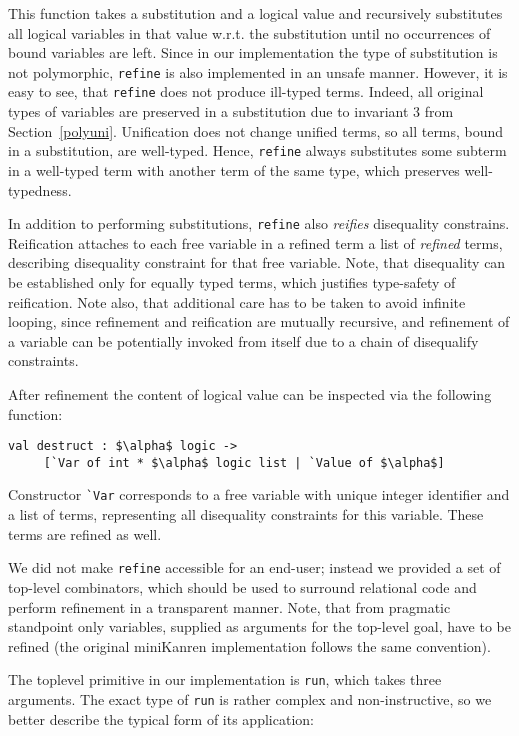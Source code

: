 \documentclass[10pt, oneside, nocopyrightspace]{sigplanconf}
\begin{document}
This function takes a substitution and a logical value and recursively substitutes
all logical variables in that value w.r.t. the substitution until no occurrences of 
bound variables are left. Since in our implementation the type of substitution is
not polymorphic, \lstinline{refine} is also implemented in an unsafe manner. However,
it is easy to see, that \lstinline{refine} does not produce ill-typed terms. Indeed,
all original types of variables are preserved in a substitution due to invariant
3 from Section~\ref{polyuni}. Unification does not change unified terms, so all terms, 
bound in a substitution, are well-typed. Hence, \lstinline{refine} always substitutes
some subterm in a well-typed term with another term of the same type, which preserves
well-typedness.

In addition to performing substitutions, \lstinline{refine} also \emph{reifies} 
disequality constrains. Reification attaches to each free variable in a refined
term a list of \emph{refined} terms, describing disequality constraint for that
free variable. Note, that disequality can be established only for equally typed
terms, which justifies type-safety of reification. Note also, that additional care has 
to be taken to avoid infinite looping, since refinement and reification are
mutually recursive, and refinement of a variable can be potentially invoked from 
itself due to a chain of disequalify constraints.

After refinement the content of logical value can be inspected via the following 
function:

\begin{lstlisting}[mathescape=true]
   val destruct : $\alpha$ logic -> 
     [`Var of int * $\alpha$ logic list | `Value of $\alpha$]
\end{lstlisting}

Constructor \lstinline{`Var} corresponds to a free variable with unique
integer identifier and a list of terms, representing all disequality constraints
for this variable. These terms are refined as well.

We did not make \lstinline{refine} accessible for an end-user; instead we provided
a set of top-level combinators, which should be used to surround relational code
and perform refinement in a transparent manner. Note, that from pragmatic
standpoint only variables, supplied as arguments for the top-level goal, have
to be refined (the original miniKanren implementation follows the same convention).

The toplevel primitive in our implementation is \lstinline{run}, which takes three
arguments. The exact type of \lstinline{run} is rather complex and non-instructive, 
so we better describe the typical form of its application:
\end{document}
